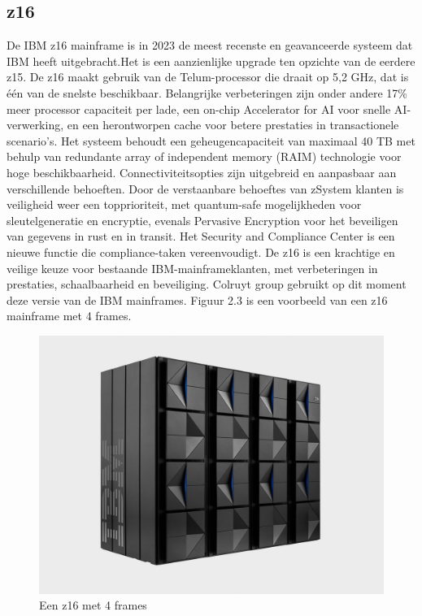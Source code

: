 \subsection{z16}
De IBM z16 mainframe is in 2023 de meest recenste en geavanceerde systeem dat IBM heeft uitgebracht.Het is een aanzienlijke upgrade ten opzichte van de eerdere z15. De z16 maakt gebruik van de Telum-processor die draait op 5,2 GHz, dat is één van de snelste beschikbaar. Belangrijke verbeteringen zijn onder andere 17\% meer processor capaciteit per lade, een on-chip Accelerator for AI voor snelle AI-verwerking, en een herontworpen cache voor betere prestaties in transactionele scenario's. Het systeem behoudt een geheugencapaciteit van maximaal 40 TB met behulp van redundante array of independent memory (RAIM) technologie voor hoge beschikbaarheid. Connectiviteitsopties zijn uitgebreid en aanpasbaar aan verschillende behoeften. Door de verstaanbare behoeftes van zSystem klanten is veiligheid weer een topprioriteit, met quantum-safe mogelijkheden voor sleutelgeneratie en encryptie, evenals Pervasive Encryption voor het beveiligen van gegevens in rust en in transit. Het Security and Compliance Center is een nieuwe functie die compliance-taken vereenvoudigt. De z16 is een krachtige en veilige keuze voor bestaande IBM-mainframeklanten, met verbeteringen in prestaties, schaalbaarheid en beveiliging. Colruyt group gebruikt op dit moment deze versie van de IBM mainframes. Figuur 2.3 is een voorbeeld van een z16 mainframe met 4 frames.~\autocite{Laura2023,Steven2023}

\begin{figure}[h]
    \centering
    \includegraphics[width=0.5\linewidth]{bachproef//graphics/4-frame-z16.jpg}
    \caption{Een z16 met 4 frames ~\autocite{Elizabeth2022}}
    \label{fig:Een z16 met 4 frames}
\end{figure}

